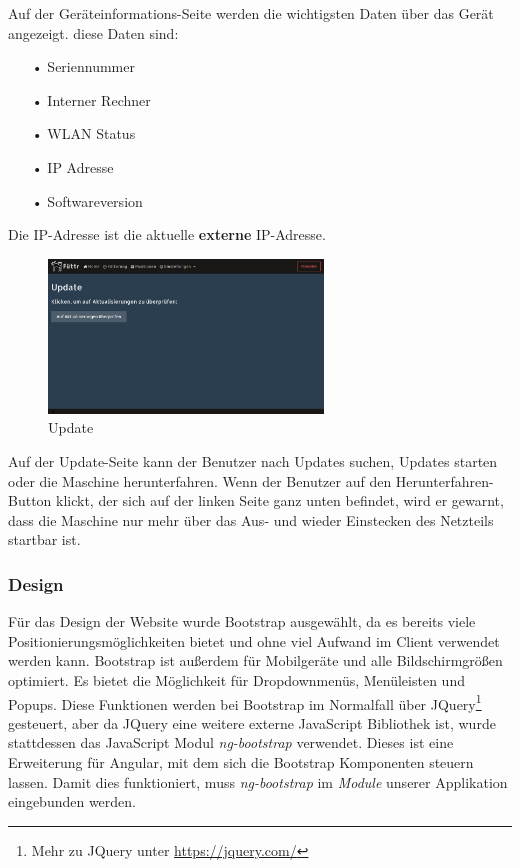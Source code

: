 Auf der Geräteinformations-Seite werden die wichtigsten Daten über das Gerät angezeigt. diese Daten sind:
\begin{itemize}
\item[•]Seriennummer
\item[•]Interner Rechner
\item[•]WLAN Status
\item[•]IP Adresse
\item[•]Softwareversion
\end{itemize}
Die IP-Adresse ist die aktuelle \textbf{externe} IP-Adresse. \\

\begin{figure}
\vspace{-10pt}
  \begin{center}
    \includegraphics[width=0.65\textwidth]{Bilder/Greistorfer/Update}
  \end{center}
  \caption{Update}
  \label{Update}
  \vspace{-10pt}
\end{figure}

Auf der Update-Seite kann der Benutzer nach Updates suchen, Updates starten oder die Maschine herunterfahren. Wenn der Benutzer auf den Herunterfahren-Button klickt, der sich auf der linken Seite ganz unten befindet, wird er gewarnt, dass die Maschine nur mehr über das Aus- und wieder Einstecken des Netzteils startbar ist.\\

\subsubsection{Design}
\label{sec:ums-client-design}
Für das Design der Website wurde Bootstrap ausgewählt, da es bereits viele Positionierungsmöglichkeiten bietet und ohne viel Aufwand im Client verwendet werden kann. Bootstrap ist außerdem für Mobilgeräte und alle Bildschirmgrößen optimiert. Es bietet die Möglichkeit für Dropdownmenüs, Menüleisten und Popups. Diese Funktionen werden bei Bootstrap im Normalfall über JQuery\footnote{Mehr zu JQuery unter \url{https://jquery.com/}} gesteuert, aber da JQuery eine weitere externe JavaScript Bibliothek ist, wurde stattdessen das JavaScript Modul \textit{ng-bootstrap} verwendet. Dieses ist eine Erweiterung für Angular, mit dem sich die Bootstrap Komponenten steuern lassen. Damit dies funktioniert, muss \textit{ng-bootstrap} im \textit{Module} unserer Applikation eingebunden werden.

